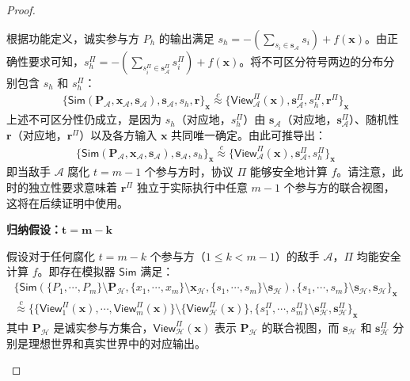 \begin{proof}
\begin{trivlist}
根据功能定义，诚实参与方 $P_h$ 的输出满足 $s_h = -(\sum_{s_i \in \textbf{s}_{\mathcal{A}}} s_i) + f(\textbf{x})$。由正确性要求可知，$s^\Pi_h = -(\sum_{s^\Pi_i \in \textbf{s}^\Pi_{\mathcal{A}}} s^\Pi_i) + f(\textbf{x})$。将不可区分符号两边的分布分别包含 $s_h$ 和 $s^\Pi_h$：
\begin{gather*}
    \{\mathsf{Sim}(\textbf{P}_{\mathcal{A}},\textbf{x}_{\mathcal{A}},\textbf{s}_{\mathcal{A}}),\textbf{s}_{\mathcal{A}},s_h, \textbf{r}\}_{\textbf{x}} \overset{c}{\approx} \{\mathsf{View}_{\mathcal{A}}^\Pi(\textbf{x}),\textbf{s}^\Pi_{\mathcal{A}},s^\Pi_h, \textbf{r}^\Pi\}_{\textbf{x}}
\end{gather*}
上述不可区分性仍成立，是因为 $s_h$（对应地，$s^\Pi_h$）由 $\textbf{s}_{\mathcal{A}}$（对应地，$\textbf{s}^\Pi_{\mathcal{A}}$）、随机性 $\textbf{r}$（对应地，$\textbf{r}^\Pi$）以及各方输入 $\textbf{x}$ 共同唯一确定。由此可推导出：
\begin{gather*}
    \{\mathsf{Sim}(\textbf{P}_{\mathcal{A}},\textbf{x}_{\mathcal{A}},\textbf{s}_{\mathcal{A}}),\textbf{s}_{\mathcal{A}},s_h\}_{\textbf{x}} \overset{c}{\approx} \{\mathsf{View}_{\mathcal{A}}^\Pi(\textbf{x}),\textbf{s}^\Pi_{\mathcal{A}},s^\Pi_h\}_{\textbf{x}}
\end{gather*}
即当敌手 $\mathcal{A}$ 腐化 $t = m-1$ 个参与方时，协议 $\Pi$ 能够安全地计算 $f$。请注意，此时的独立性要求意味着 $\textbf{r}^\Pi$ 独立于实际执行中任意 $m-1$ 个参与方的联合视图，这将在后续证明中使用。

\item[$-$] \textbf{归纳假设：$\mathbf{t = m-k}$}

假设对于任何腐化 $t = m-k$ 个参与方（$1 \le k < m-1$）的敌手 $\mathcal{A}$，$\Pi$ 均能安全计算 $f$。即存在模拟器 $\mathsf{Sim}$ 满足：
\begin{gather*}
    \{\mathsf{Sim}(\{P_1, \cdots, P_m\} \setminus \textbf{P}_\mathcal{H},\{x_{1},\cdots,x_{m}\} \setminus \textbf{x}_\mathcal{H}, \{s_{1},\cdots,s_{m}\} \setminus \textbf{s}_\mathcal{H}), \{s_{1},\cdots,s_{m}\} \setminus \textbf{s}_\mathcal{H}, \textbf{s}_\mathcal{H}\}_{\textbf{x}} \\
    \overset{c}{\approx} \{\{\mathsf{View}_{1}^\Pi(\textbf{x}),\cdots,\mathsf{View}_{m}^\Pi(\textbf{x})\} \setminus \{\mathsf{View}_{\mathcal{H}}^\Pi(\textbf{x})\}, \{s^\Pi_{1},\cdots,s^\Pi_{m}\} \setminus \textbf{s}^\Pi_{\mathcal{H}}, \textbf{s}^\Pi_{\mathcal{H}}\}_{\textbf{x}}
\end{gather*}
其中 $\textbf{P}_\mathcal{H}$ 是诚实参与方集合，$\mathsf{View}_{\mathcal{H}}^\Pi(\textbf{x})$ 表示 $\textbf{P}_\mathcal{H}$ 的联合视图，而 $\textbf{s}_{\mathcal{H}}$ 和 $\textbf{s}^\Pi_{\mathcal{H}}$ 分别是理想世界和真实世界中的对应输出。


\end{trivlist}
\end{proof}
